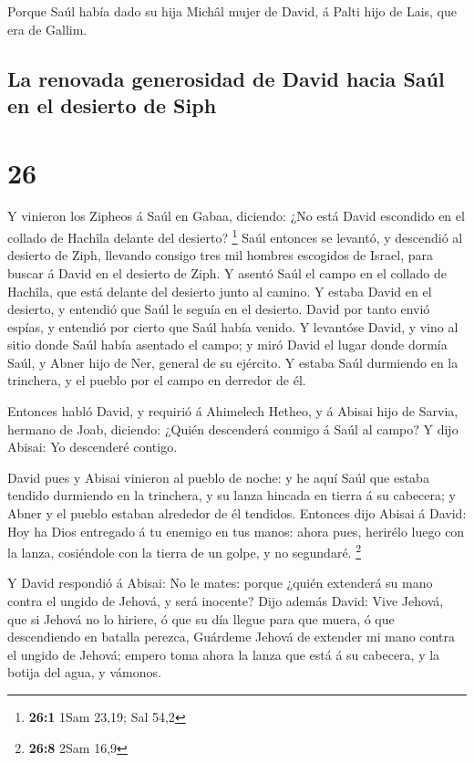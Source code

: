  Porque Saúl había dado su hija Michâl mujer de David, á
Palti hijo de Lais, que era de Gallim.

\hypertarget{la-renovada-generosidad-de-david-hacia-sauxfal-en-el-desierto-de-siph}{%
\subsection{La renovada generosidad de David hacia Saúl en el desierto
de
Siph}\label{la-renovada-generosidad-de-david-hacia-sauxfal-en-el-desierto-de-siph}}

\hypertarget{section-25}{%
\section{26}\label{section-25}}

 Y vinieron los Zipheos á Saúl en Gabaa, diciendo: ¿No está
David escondido en el collado de Hachîla delante del desierto?
\footnote{\textbf{26:1} 1Sam 23,19; Sal 54,2}  Saúl entonces
se levantó, y descendió al desierto de Ziph, llevando consigo tres mil
hombres escogidos de Israel, para buscar á David en el desierto de Ziph.
 Y asentó Saúl el campo en el collado de Hachîla, que está
delante del desierto junto al camino. Y estaba David en el desierto, y
entendió que Saúl le seguía en el desierto.  David por tanto
envió espías, y entendió por cierto que Saúl había venido. 
Y levantóse David, y vino al sitio donde Saúl había asentado el campo; y
miró David el lugar donde dormía Saúl, y Abner hijo de Ner, general de
su ejército. Y estaba Saúl durmiendo en la trinchera, y el pueblo por el
campo en derredor de él.

 Entonces habló David, y requirió á Ahimelech Hetheo, y á
Abisai hijo de Sarvia, hermano de Joab, diciendo: ¿Quién descenderá
conmigo á Saúl al campo? Y dijo Abisai: Yo descenderé contigo.

 David pues y Abisai vinieron al pueblo de noche: y he aquí
Saúl que estaba tendido durmiendo en la trinchera, y su lanza hincada en
tierra á su cabecera; y Abner y el pueblo estaban alrededor de él
tendidos.  Entonces dijo Abisai á David: Hoy ha Dios
entregado á tu enemigo en tus manos: ahora pues, herirélo luego con la
lanza, cosiéndole con la tierra de un golpe, y no segundaré. \footnote{\textbf{26:8}
  2Sam 16,9}

 Y David respondió á Abisai: No le mates: porque ¿quién
extenderá su mano contra el ungido de Jehová, y será inocente?
 Dijo además David: Vive Jehová, que si Jehová no lo
hiriere, ó que su día llegue para que muera, ó que descendiendo en
batalla perezca,  Guárdeme Jehová de extender mi mano
contra el ungido de Jehová; empero toma ahora la lanza que está á su
cabecera, y la botija del agua, y vámonos.

